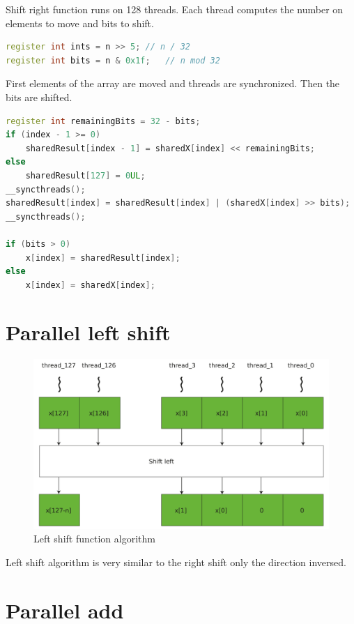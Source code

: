 \documentclass[oneside,openright,12pt,final,en]{mgr}
\begin{document}
Shift right function runs on 128 threads. Each thread computes the number on elements to move and bits to shift.

\begin{lstlisting}[language=cpp]
register int ints = n >> 5;	// n / 32
register int bits = n & 0x1f;	// n mod 32
\end{lstlisting}

First elements of the array are moved and threads are synchronized. Then the bits are shifted. 

\begin{lstlisting}[language=cpp]
register int remainingBits = 32 - bits;
if (index - 1 >= 0)
	sharedResult[index - 1] = sharedX[index] << remainingBits;
else
	sharedResult[127] = 0UL;
__syncthreads();
sharedResult[index] = sharedResult[index] | (sharedX[index] >> bits);
__syncthreads();

if (bits > 0)
	x[index] = sharedResult[index];
else
	x[index] = sharedX[index];
\end{lstlisting}

\section{Parallel left shift}

\begin{figure}[H]
	\centering
	\includegraphics[width=\textwidth]{al_leftshift}
	\caption{Left shift function algorithm}
	\label{fig:al_leftshift}
\end{figure}

Left shift algorithm is very similar to the right shift only the direction inversed. 


\section{Parallel add}
\end{document}
